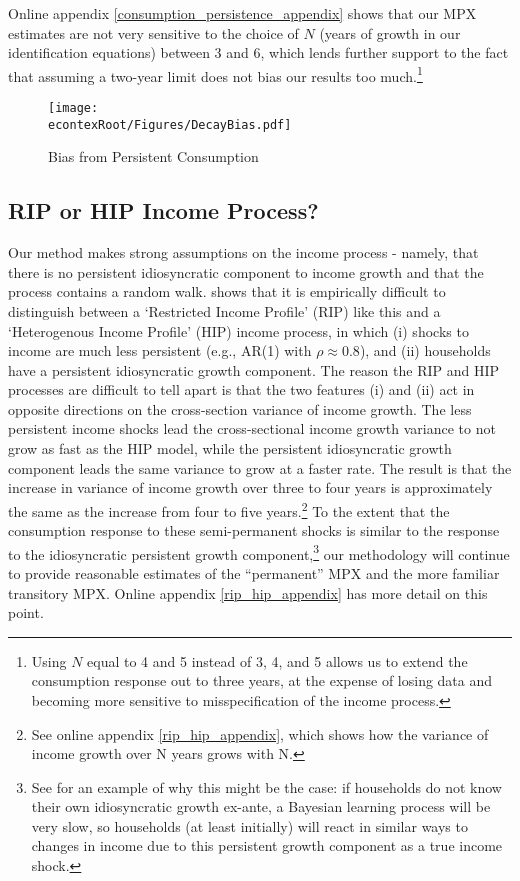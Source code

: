 \documentclass[titlepage]{\econtex}\newcommand{\texname}{ConsumptionHeterogeneity}
\begin{document}
Online appendix \ref{consumption_persistence_appendix} shows that our MPX estimates are not very sensitive to the choice of $N$ (years of growth in our identification equations) between 3 and 6, which lends further support to the fact that assuming a two-year limit does not bias our results too much.\footnote{Using $N$ equal to 4 and 5 instead of 3, 4, and 5 allows us to extend the consumption response out to three years, at the expense of losing data and becoming more sensitive to misspecification of the income process.}
\begin{figure} 
	\begin{centering}
		\texttt{[image: \\econtexRoot/Figures/DecayBias.pdf]}
		\caption{Bias from Persistent Consumption}
		\label{fig:DecayBias}
	\end{centering}
\end{figure}

\subsection{RIP or HIP Income Process?} \label{rip_hip}
Our method makes strong assumptions on the income process - namely, that there is no persistent idiosyncratic component to income growth and that the process contains a random walk. \cite{guvenen_empirical_2009} shows that it is empirically difficult to distinguish between a `Restricted Income Profile' (RIP) like this and a `Heterogenous Income Profile' (HIP) income process, in which (i) shocks to income are much less persistent (e.g., AR(1) with $\rho\approx 0.8$), and (ii) households have a persistent idiosyncratic growth component. The reason the RIP and HIP processes are difficult to tell apart is that the two features (i) and (ii) act in opposite directions on the cross-section variance of income growth. The less persistent income shocks lead the cross-sectional income growth variance to not grow as fast as the HIP model, while the persistent idiosyncratic growth component leads the same variance to grow at a faster rate. The result is that the increase in variance of income growth over three to four years is approximately the same as the increase from four to five years.\footnote{See online appendix \ref{rip_hip_appendix}, which shows how the variance of income growth over N years grows with N.} To the extent that the consumption response to these semi-permanent shocks is similar to the response to the idiosyncratic persistent growth component,\footnote{See \cite{guvenen_learning_2007} for an example of why this might be the case: if households do not know their own idiosyncratic growth ex-ante, a Bayesian learning process will be very slow, so households (at least initially) will react in similar ways to changes in income due to this persistent growth component as a true income shock.} our methodology will continue to provide reasonable estimates of the ``permanent'' MPX and the more familiar transitory MPX. Online appendix \ref{rip_hip_appendix} has more detail on this point.
\end{document}
